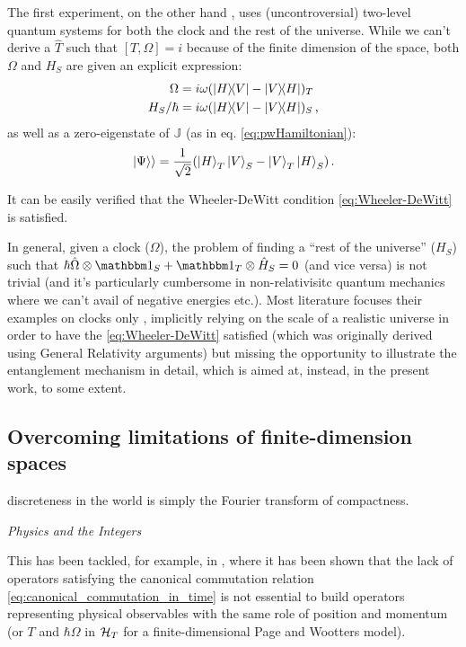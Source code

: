 The first experiment, on the other hand \parencite{Moreva:illustration,Moreva:synthetic},
uses (uncontroversial)
two-level quantum systems for both the clock and the rest of the universe.
While we can't derive a $\hat{T}$ such that $[T, \Omega] = i$
because of the finite dimension of the space, both $\Omega$
and $H_S$ are given an explicit expression:
\begin{align}\label{eq:MorevaOmegaT}
  \Omega            &= i\omega(\ketbra{H}{V}- \ketbra{V}{H})_T \\
  H_S/{\hbar}       &= i\omega(\ketbra{H}{V}- \ketbra{V}{H})_S
  \,\text{,}
\end{align} 
as well as a zero-eigenstate of $\mathbb{J}$ (as in eq. \ref{eq:pwHamiltonian}):
\begin{equation}
  \left.\left| \Psi \right\rangle\right\rangle = \frac{1}{\sqrt{2}}\qty(\ket{H}_T\ket{V}_S-\ket{V}_T\ket{H}_S)
  \,\text{.}
\end{equation}

It can be easily verified that the Wheeler-DeWitt condition
\eqref{eq:Wheeler-DeWitt} is satisfied.

In general, given a clock ($\Omega$), the problem of finding a
``rest of the universe'' ($H_S$) such that
$\hbar\hat{\Omega}\ox\idop_S + \idop_T\ox\hat{H}_S = 0$
(and vice versa)
is not trivial
(and it's particularly cumbersome in non-relativisitc
quantum mechanics where we can't avail of negative energies etc.).
Most literature focuses their examples on clocks only
\parencite{Prvanovic,RealisticClocks,HarmonicClocks},
implicitly relying on the scale of a realistic universe
in order to have the \eqref{eq:Wheeler-DeWitt} satisfied
(which was originally derived using General Relativity arguments)
but missing the opportunity to illustrate the entanglement mechanism in detail,
which is aimed at, instead, in the present work, to some extent.

\subsection{Overcoming limitations of finite-dimension spaces}\label{sec:finite-quantum}
\epigraph{\textelp{} discreteness in the world is simply the Fourier transform of compactness.}{
  \emph{Physics and the Integers} \parencite{Tong_Integers}
}%
\noindent{}%
This has been tackled, for example, in \cite{FiniteHilb},
where it has been shown that the lack of operators satisfying the canonical
commutation relation \eqref{eq:canonical_commutation_in_time}
is not essential to build operators representing physical observables
with the same role of position and momentum (or $T$ and $\hbar\Omega$
in $\mathcal{H}_T$ for a finite-dimensional Page and Wootters model).

